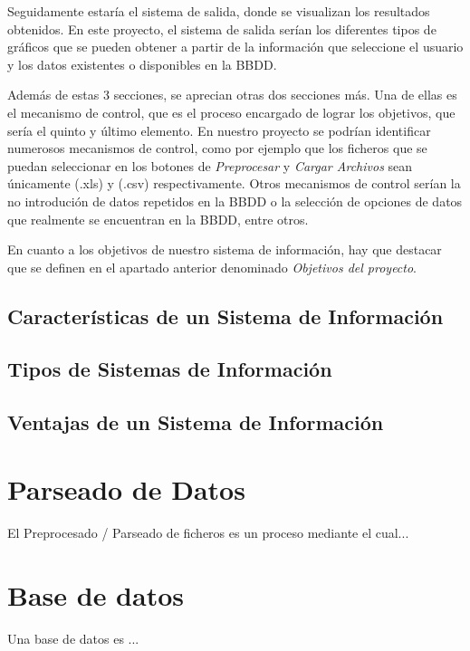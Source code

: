 Seguidamente estaría el sistema de salida, donde se visualizan los resultados obtenidos. En este proyecto, el sistema de salida serían los diferentes tipos de gráficos que se pueden obtener a partir de la información que seleccione el usuario y los datos existentes o disponibles en la BBDD.

Además de estas 3 secciones, se aprecian otras dos secciones más. Una de ellas es el mecanismo de control, que es el proceso encargado de lograr los objetivos, que sería el quinto y último elemento.
En nuestro proyecto se podrían identificar numerosos mecanismos de control, como por ejemplo que los ficheros que se puedan seleccionar en los botones de \emph{Preprocesar} y \emph{Cargar Archivos} sean únicamente (.xls) y (.csv) respectivamente. Otros mecanismos de control serían la no introdución de datos repetidos en la BBDD o la selección de opciones de datos que realmente se encuentran en la BBDD, entre otros.

En cuanto a los objetivos de nuestro sistema de información, hay que destacar que se definen en el apartado anterior denominado \emph{Objetivos del proyecto}.

\subsection{Características de un Sistema de Información}



\subsection{Tipos de Sistemas de Información}



\subsection{Ventajas de un Sistema de Información}



\section{Parseado de Datos}
El Preprocesado / Parseado de ficheros es un proceso mediante el cual...




\section{Base de datos}
Una base de datos es ...

